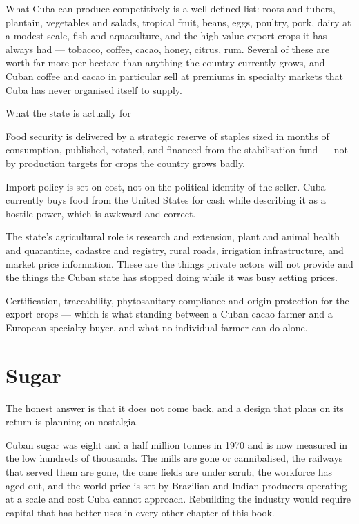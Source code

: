What Cuba can produce competitively is a well-defined list: roots and tubers,
plantain, vegetables and salads, tropical fruit, beans, eggs, poultry, pork,
dairy at a modest scale, fish and aquaculture, and the high-value export crops it
has always had --- tobacco, coffee, cacao, honey, citrus, rum. Several of these
are worth far more per hectare than anything the country currently grows, and
Cuban coffee and cacao in particular sell at premiums in specialty markets that
Cuba has never organised itself to supply.

\begin{design}{What the state is actually for}
\label{d:foodsec}
\begin{rules}
 Food security is delivered by a strategic reserve
of staples sized in months of consumption, published, rotated, and financed from
the stabilisation fund --- not by production targets for crops the country grows
badly.

 Import policy is set on cost, not on the political
identity of the seller. Cuba currently buys food from the United States for cash
while describing it as a hostile power, which is awkward and correct.

 The state's agricultural role is research and extension,
plant and animal health and quarantine, cadastre and registry, rural roads,
irrigation infrastructure, and market price information. These are the things
private actors will not provide and the things the Cuban state has stopped doing
while it was busy setting prices.

 Certification, traceability, phytosanitary compliance
and origin protection for the export crops --- which is what standing between a
Cuban cacao farmer and a European specialty buyer, and what no individual farmer
can do alone.
\end{rules}
\end{design}

\section{Sugar}

The honest answer is that it does not come back, and a design that plans on its
return is planning on nostalgia.

Cuban sugar was eight and a half million tonnes in 1970 and is now measured in
the low hundreds of thousands. The mills are gone or cannibalised, the railways
that served them are gone, the cane fields are under scrub, the workforce has
aged out, and the world price is set by Brazilian and Indian producers operating
at a scale and cost Cuba cannot approach. Rebuilding the industry would require
capital that has better uses in every other chapter of this book.

